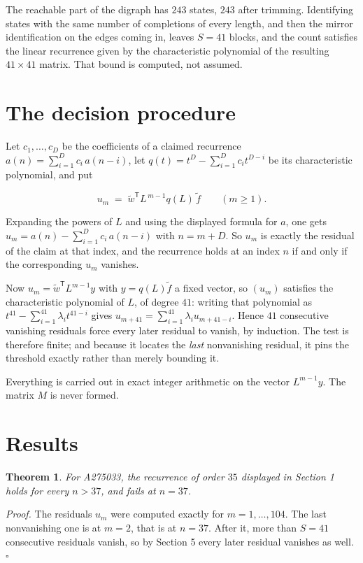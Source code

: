 \documentclass[11pt]{article}
\newtheorem{theorem}{Theorem}
\theoremstyle{definition}
\begin{document}
The reachable part of the digraph has $243$ states, $243$ after trimming. Identifying states with the same number of completions of every length, and then the mirror identification on the edges coming in, leaves $S = 41$ blocks, and the count satisfies the linear recurrence given by the characteristic polynomial of the resulting $41\times41$ matrix. That bound is computed, not assumed.

\section{The decision procedure}

Let $c_1,\dots,c_D$ be the coefficients of a claimed recurrence $a(n) = \sum_{i=1}^{D} c_i\,a(n-i)$, let $q(t) = t^{D} - \sum_{i=1}^{D} c_i t^{D-i}$ be its characteristic polynomial, and put

\[u_m \;=\; \tilde w^{\mathsf T} L^{\,m-1} q(L)\,\tilde f \qquad (m \ge 1).\]

Expanding the powers of $L$ and using the displayed formula for $a$, one gets $u_m = a(n) - \sum_{i=1}^{D} c_i\,a(n-i)$ with $n = m + D$. So $u_m$ is exactly the residual of the claim at that index, and the recurrence holds at an index $n$ if and only if the corresponding $u_m$ vanishes.

Now $u_m = \tilde w^{\mathsf T} L^{m-1} y$ with $y = q(L)\tilde f$ a fixed vector, so $(u_m)$ satisfies the characteristic polynomial of $L$, of degree $41$: writing that polynomial as $t^{41} - \sum_{i=1}^{41} \lambda_i t^{41-i}$ gives $u_{m+41} = \sum_{i=1}^{41} \lambda_i u_{m+41-i}$. Hence $41$ consecutive vanishing residuals force every later residual to vanish, by induction. The test is therefore finite; and because it locates the {\itshape last} nonvanishing residual, it pins the threshold exactly rather than merely bounding it.

Everything is carried out in exact integer arithmetic on the vector $L^{m-1}y$. The matrix $M$ is never formed.

\section{Results}

\begin{theorem} For A275033, the recurrence of order $35$ displayed in Section 1 holds for every $n > 37$, and fails at $n = 37$.\end{theorem}

{\itshape Proof.} The residuals $u_m$ were computed exactly for $m = 1,\dots,104$. The last nonvanishing one is at $m = 2$, that is at $n = 37$. After it, more than $S = 41$ consecutive residuals vanish, so by Section 5 every later residual vanishes as well. $\square$
\end{document}
